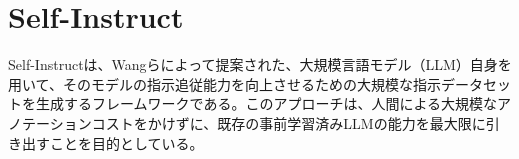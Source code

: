 \documentclass[a4paper,11pt]{jreport}
\begin{document}






\section{Self-Instruct}
\label{sec:self-instruct}

Self-Instructは、Wangらによって提案された\cite{Self-Instruct}、大規模言語モデル（LLM）自身を用いて、そのモデルの指示追従能力を向上させるための大規模な指示データセットを生成するフレームワークである。このアプローチは、人間による大規模なアノテーションコストをかけずに、既存の事前学習済みLLMの能力を最大限に引き出すことを目的としている。
\end{document}
